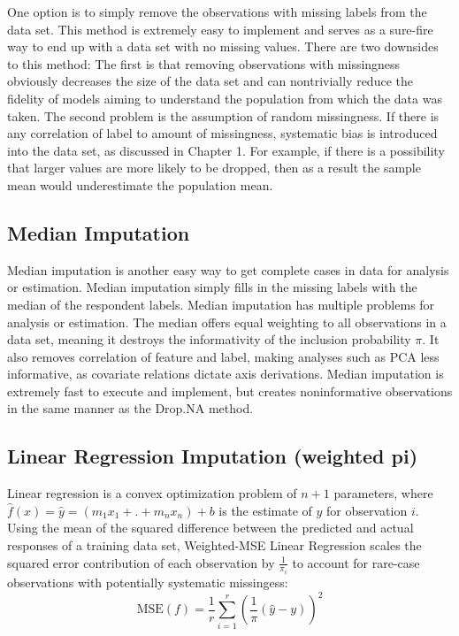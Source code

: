 \documentclass[12pt,twoside]{reedthesis}
\begin{document}
One option is to simply remove the observations with missing labels from
the data set. This method is extremely easy to implement and serves as a
sure-fire way to end up with a data set with no missing values. There
are two downsides to this method: The first is that removing
observations with missingness obviously decreases the size of the data
set and can nontrivially reduce the fidelity of models aiming to
understand the population from which the data was taken. The second
problem is the assumption of random missingness. If there is any
correlation of label to amount of missingness, systematic bias is
introduced into the data set, as discussed in Chapter 1. For example, if
there is a possibility that larger values are more likely to be dropped,
then as a result the sample mean would underestimate the population
mean.

\subsection{Median Imputation}\label{median-imputation}

Median imputation is another easy way to get complete cases in data for
analysis or estimation. Median imputation simply fills in the missing
labels with the median of the respondent labels. Median imputation has
multiple problems for analysis or estimation. The median offers equal
weighting to all observations in a data set, meaning it destroys the
informativity of the inclusion probability \(\pi\). It also removes
correlation of feature and label, making analyses such as PCA less
informative, as covariate relations dictate axis derivations. Median
imputation is extremely fast to execute and implement, but creates
noninformative observations in the same manner as the Drop.NA method.

\subsection{Linear Regression Imputation (weighted
pi)}\label{linear-regression-imputation-weighted-pi}

Linear regression is a convex optimization problem of \(n+1\)
parameters, where \(\hat f(x) = \hat y = (m_1x_1 + .+ m_nx_n)+b\) is the
estimate of \(y\) for observation \(i\). Using the mean of the squared
difference between the predicted and actual responses of a training data
set, Weighted-MSE Linear Regression scales the squared error
contribution of each observation by \(\frac{1}{\pi_i}\) to account for
rare-case observations with potentially systematic missingess: \[
\text{MSE}(f) = \frac{1}{r} \sum_{i=1}^r  (\frac{1}{\pi}(\hat{y} - y))^2
\]
\end{document}
